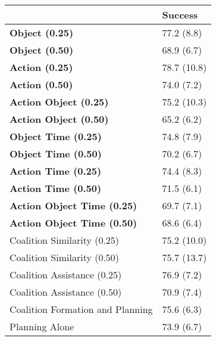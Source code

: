\begin{tabular}{ll}
\hline
                                    & Success     \\
\hline
 \textbf{Object (0.25)}             & 77.2 (8.8)  \\
 \textbf{Object (0.50)}             & 68.9 (6.7)  \\
 \textbf{Action (0.25)}             & 78.7 (10.8) \\
 \textbf{Action (0.50)}             & 74.0 (7.2)  \\
 \textbf{Action Object (0.25)}      & 75.2 (10.3) \\
 \textbf{Action Object (0.50)}      & 65.2 (6.2)  \\
 \textbf{Object Time (0.25)}        & 74.8 (7.9)  \\
 \textbf{Object Time (0.50)}        & 70.2 (6.7)  \\
 \textbf{Action Time (0.25)}        & 74.4 (8.3)  \\
 \textbf{Action Time (0.50)}        & 71.5 (6.1)  \\
 \textbf{Action Object Time (0.25)} & 69.7 (7.1)  \\
 \textbf{Action Object Time (0.50)} & 68.6 (6.4)  \\
 Coalition Similarity (0.25)        & 75.2 (10.0) \\
 Coalition Similarity (0.50)        & 75.7 (13.7) \\
 Coalition Assistance (0.25)        & 76.9 (7.2)  \\
 Coalition Assistance (0.50)        & 70.9 (7.4)  \\
 Coalition Formation and Planning   & 75.6 (6.3)  \\
 Planning Alone                     & 73.9 (6.7)  \\
\hline
\end{tabular}
